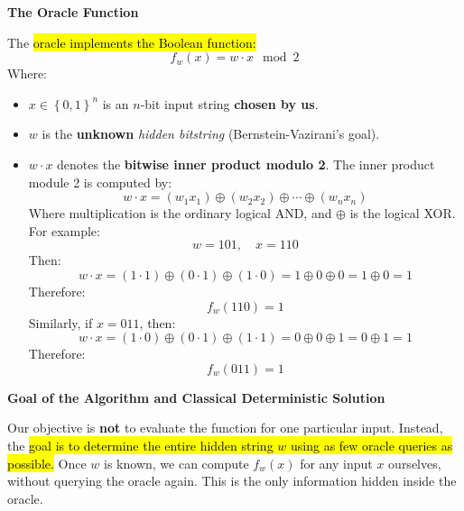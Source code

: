 \highspace
\begin{flushleft}
    \textcolor{Green3}{ \textbf{The Oracle Function}}
\end{flushleft}
The \hl{oracle implements the Boolean function:}
\begin{equation}\label{eq:bernstein-vazirani-oracle-function}
    f_w (x) = w \cdot x \mod 2
\end{equation}
Where:
\begin{itemize}
    \item[\textcolor{Green3}{\faIcon{check}}] $x \in \left\{0,1\right\}^{n}$ is an $n$-bit input string \textbf{chosen by us}.
    \item[\textcolor{Green3}{\faIcon{question-circle}}] $w$ is the \textbf{unknown} \emph{hidden bitstring} (Bernstein-Vazirani's goal).
    \item $w \cdot x$ denotes the \textbf{bitwise inner product modulo 2}. The inner product module 2 is computed by:
    \begin{equation*}
        w \cdot x = \left(w_1 x_1\right) \oplus \left(w_2 x_2\right) \oplus \cdots \oplus \left(w_n x_n\right)
    \end{equation*}
    Where multiplication is the ordinary logical AND, and $\oplus$ is the logical XOR. For example:
    \begin{equation*}
        w = 101, \quad x = 110
    \end{equation*}
    Then:
    \begin{equation*}
        w \cdot x = \left(1 \cdot 1\right) \oplus \left(0 \cdot 1\right) \oplus \left(1 \cdot 0\right) = 1 \oplus 0 \oplus 0 = 1 \oplus 0 = 1
    \end{equation*}
    Therefore:
    \begin{equation*}
        f_w (110) = 1
    \end{equation*}
    Similarly, if $x = 011$, then:
    \begin{equation*}
        w \cdot x = \left(1 \cdot 0\right) \oplus \left(0 \cdot 1\right) \oplus \left(1 \cdot 1\right) = 0 \oplus 0 \oplus 1 = 0 \oplus 1 = 1
    \end{equation*}
    Therefore:
    \begin{equation*}
        f_w (011) = 1
    \end{equation*}
\end{itemize}

\highspace
\begin{flushleft}
    \textcolor{Green3}{ \textbf{Goal of the Algorithm and Classical Deterministic Solution}}
\end{flushleft}
Our objective is \textbf{not} to evaluate the function for one particular input. Instead, the \hl{goal is to determine the entire hidden string $w$ using as few oracle queries as possible.} Once $w$ is known, we can compute $f_w (x)$ for any input $x$ ourselves, without querying the oracle again. This is the only information hidden inside the oracle.

